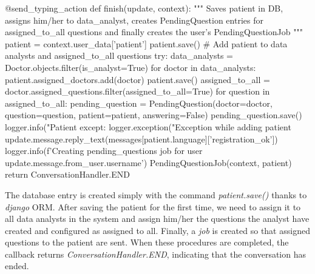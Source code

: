 \documentclass[12pt,english]{article}
\begin{document}
\begin{python}[caption={Patient saver callback}, captionpos=b]
  @send_typing_action
  def finish(update, context):
      """
      Saves patient in DB, assigns him/her to data_analyst, creates PendingQuestion entries for assigned_to_all questions and finally creates the user's PendingQuestionJob
      """
      patient = context.user_data['patient']
      patient.save()
      # Add patient to data analysts and assigned_to_all questions
      try:
          data_analysts = Doctor.objects.filter(is_analyst=True)
          for doctor in data_analysts:
              patient.assigned_doctors.add(doctor)
              patient.save()
              assigned_to_all = doctor.assigned_questions.filter(assigned_to_all=True)
              for question in assigned_to_all:
                  pending_question = PendingQuestion(doctor=doctor, question=question, patient=patient, answering=False)
                  pending_question.save()
          logger.info("Patient %
      except:
          logger.exception("Exception while adding patient %
      update.message.reply_text(messages[patient.language]['registration_ok'])
      logger.info(f'Creating pending_questions job for user {update.message.from_user.username}')
      PendingQuestionJob(context, patient)
      return ConversationHandler.END
\end{python}

The database entry is created simply with the command \emph{patient.save()} thanks to \emph{django} ORM. After saving the patient for the first time, we need to assign it to all data analysts in the system and assign him/her the questions the analyst have created and configured as assigned to all. Finally, a \emph{job} is created so that assigned questions to the patient are sent. When these procedures are completed, the callback returns \emph{ConversationHandler.END}, indicating that the conversation has ended.
\end{document}
